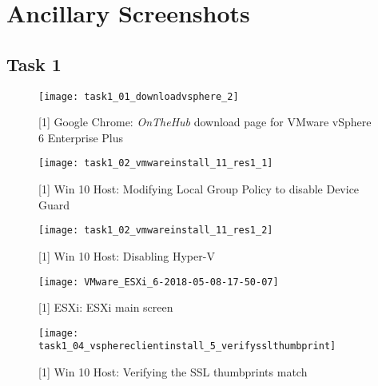\section{Ancillary Screenshots}
\label{app:ancillaryscreenshots}

\subsection{Task 1}

\begin{figure}[H]
  \centering
  \captionsetup{skip=2pt}
  \texttt{[image: task1\_01\_downloadvsphere\_2]}
  \caption{[1] Google Chrome: \textit{OnTheHub\textsuperscript{\textregistered}} download page for VMware vSphere 6 Enterprise Plus}
  \label{fig:task1:01_downloadvsphere}
\end{figure}

\begin{figure}[H]
  \centering
  \captionsetup{skip=2pt}
  \texttt{[image: task1\_02\_vmwareinstall\_11\_res1\_1]}
  \caption{[1] Win 10 Host: Modifying Local Group Policy to disable Device Guard}
  \label{fig:task1:02_vmware_11_res1}
\end{figure}

\begin{figure}[H]
  \centering
  \captionsetup{skip=2pt}
  \texttt{[image: task1\_02\_vmwareinstall\_11\_res1\_2]}
  \caption{[1] Win 10 Host: Disabling Hyper-V}
  \label{fig:task1:02_vmware_11_res2}
\end{figure}

\begin{figure}[H]
  \centering
  \captionsetup{skip=2pt}
  \texttt{[image: VMware\_ESXi\_6-2018-05-08-17-50-07]}
  \caption{[1] ESXi: ESXi main screen}
  \label{fig:task1:esxiinstall_up}
\end{figure}

\begin{figure}[H]
  \centering
  \captionsetup{skip=2pt}
  \texttt{[image: task1\_04\_vsphereclientinstall\_5\_verifysslthumbprint]}
  \caption{[1] Win 10 Host: Verifying the SSL thumbprints match}
  \label{fig:task1:vspheredesktopclient_03}
\end{figure}

